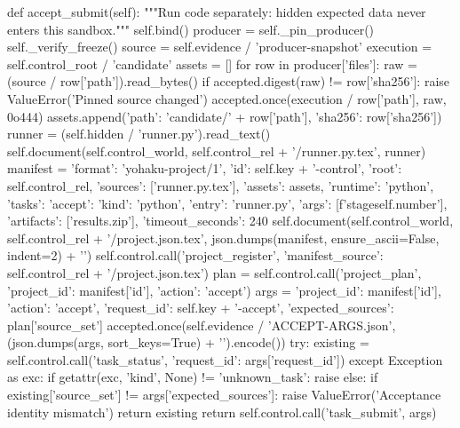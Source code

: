     def accept_submit(self):
        """Run code separately: hidden expected data never enters this sandbox."""
        self.bind()
        producer = self._pin_producer()
        self._verify_freeze()
        source = self.evidence / 'producer-snapshot'
        execution = self.control_root / 'candidate'
        assets = []
        for row in producer['files']:
            raw = (source / row['path']).read_bytes()
            if accepted.digest(raw) != row['sha256']:
                raise ValueError('Pinned source changed')
            accepted.once(execution / row['path'], raw, 0o444)
            assets.append({'path': 'candidate/' + row['path'], 'sha256': row['sha256']})
        runner = (self.hidden / 'runner.py').read_text()
        self.document(self.control_world, self.control_rel + '/runner.py.tex', runner)
        manifest = {'format': 'yohaku-project/1', 'id': self.key + '-control', 'root': self.control_rel,
                    'sources': ['runner.py.tex'], 'assets': assets, 'runtime': 'python',
                    'tasks': {'accept': {'kind': 'python', 'entry': 'runner.py',
                        'args': [f'stage{self.number}'], 'artifacts': ['results.zip'], 'timeout_seconds': 240}}}
        self.document(self.control_world, self.control_rel + '/project.json.tex', json.dumps(manifest, ensure_ascii=False, indent=2) + '\n')
        self.control.call('project_register', {'manifest_source': self.control_rel + '/project.json.tex'})
        plan = self.control.call('project_plan', {'project_id': manifest['id'], 'action': 'accept'})
        args = {'project_id': manifest['id'], 'action': 'accept', 'request_id': self.key + '-accept',
                'expected_sources': plan['source_set']}
        accepted.once(self.evidence / 'ACCEPT-ARGS.json', (json.dumps(args, sort_keys=True) + '\n').encode())
        try:
            existing = self.control.call('task_status', {'request_id': args['request_id']})
        except Exception as exc:
            if getattr(exc, 'kind', None) != 'unknown_task':
                raise
        else:
            if existing['source_set'] != args['expected_sources']:
                raise ValueError('Acceptance identity mismatch')
            return existing
        return self.control.call('task_submit', args)

